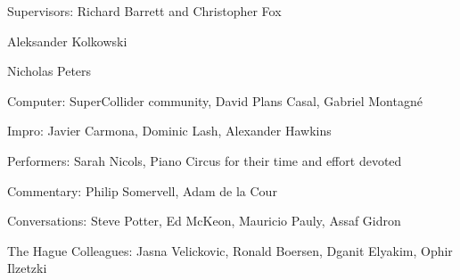 Supervisors: Richard Barrett and Christopher Fox

Aleksander Kolkowski

Nicholas Peters

Computer: SuperCollider community, David Plans Casal, Gabriel Montagn\'e

Impro: Javier Carmona, Dominic Lash, Alexander Hawkins

Performers: Sarah Nicols, Piano Circus for their time and effort devoted

Commentary: Philip Somervell, Adam de la Cour

Conversations: Steve Potter, Ed McKeon, Mauricio Pauly, Assaf Gidron

The Hague Colleagues: Jasna Velickovic, Ronald Boersen, Dganit Elyakim, Ophir Ilzetzki

\label{ch:intro}
